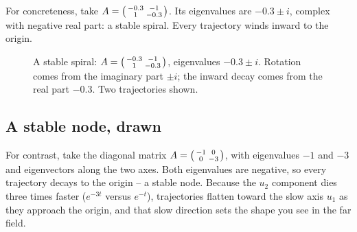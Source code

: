 For concreteness, take $A = \begin{psmallmatrix} -0.3 & -1 \\ 1 &
-0.3\end{psmallmatrix}$. Its eigenvalues are $-0.3 \pm i$, complex with negative
real part: a stable spiral. Every trajectory winds inward to the origin.

\begin{figure}[H]
\centering
{}
\caption{A stable spiral: $A=\protect\begin{psmallmatrix} -0.3 & -1 \\ 1 &
-0.3\protect\end{psmallmatrix}$, eigenvalues $-0.3\pm i$. Rotation comes from the
imaginary part $\pm i$; the inward decay comes from the real part $-0.3$. Two
trajectories shown.}
\label{ch39:fig-spiral}
\end{figure}

\subsection{A stable node, drawn}

For contrast, take the diagonal matrix
$A = \begin{psmallmatrix} -1 & 0 \\ 0 & -3\end{psmallmatrix}$, with eigenvalues
$-1$ and $-3$ and eigenvectors along the two axes. Both eigenvalues are negative,
so every trajectory decays to the origin -- a stable node. Because the $u_2$
component dies three times faster ($e^{-3t}$ versus $e^{-t}$), trajectories flatten
toward the slow axis $u_1$ as they approach the origin, and that slow direction
sets the shape you see in the far field.

